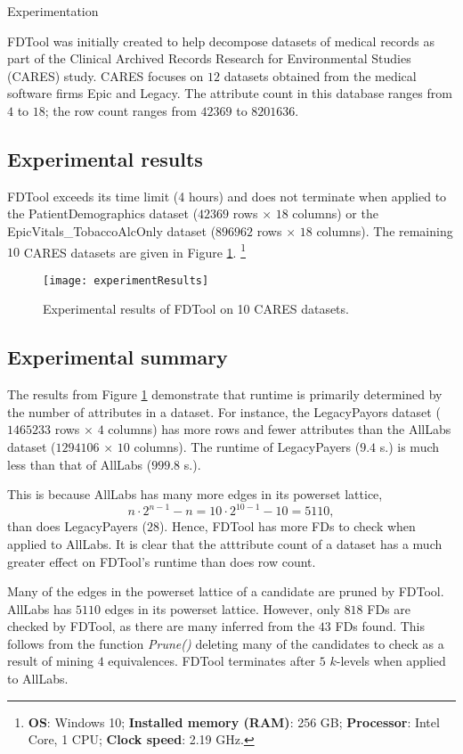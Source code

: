 \documentclass[6pt,twoside]{article}
\theoremstyle{plain}
\theoremstyle{definition}
\begin{document}
\begin{section}{Experimentation}

FDTool was initially created to help decompose datasets of medical records as part of the Clinical Archived Records Research for Environmental Studies (CARES) study. CARES focuses on $12$ datasets obtained from the medical software firms Epic and Legacy. The attribute count in this database ranges from $4$ to $18$; the row count ranges from $42369$ to $8201636$.

\subsection[Experimental results]{Experimental results}

FDTool exceeds its time limit (4 hours) and does not terminate when applied to the PatientDemographics dataset ($42369$ rows $\times$ $18$ columns) or the EpicVitals\_TobaccoAlcOnly dataset ($896962$ rows $\times$ $18$ columns). The remaining $10$ CARES datasets are given in Figure \ref{fig:CARES}. \footnote{\textbf{OS}: Windows 10; \textbf{Installed memory (RAM)}: 256 GB; \textbf{Processor}: Intel Core, 1 CPU; \textbf{Clock speed}: 2.19 GHz.} 

\begin{figure}[h]
	\centering
	\texttt{[image: experimentResults]}
	\textbf{\label{Fig. 2}}
	\caption{Experimental results of FDTool on 10 CARES datasets.}
	\label{fig:CARES}
\end{figure}

\subsection[Experimental summary]{Experimental summary}

The results from Figure \ref{fig:CARES} demonstrate that runtime is primarily determined by the number of attributes in a  dataset. For instance, the LegacyPayors dataset ($1465233$ rows $\times$ $4$ columns) has more rows and fewer attributes than the AllLabs dataset ($1294106$ $\times$ $10$ columns). The runtime of LegacyPayers ($9.4$ s.) is much less than that of AllLabs ($999.8$ s.).

This is because AllLabs has many more edges in its powerset lattice, 
$$
n \cdot 2^{n-1}-n= 10 \cdot 2^{10-1} - 10 = 5110,
$$
than does LegacyPayers ($28$). Hence, FDTool has more FDs to check when applied to AllLabs. It is clear that the atttribute count of a dataset has a much greater effect on FDTool's runtime than does row count.

Many of the edges in the powerset lattice of a candidate are pruned by FDTool. AllLabs has $5110$ edges in its powerset lattice. However, only $818$ FDs are checked by FDTool, as there are many inferred from the $43$ FDs found. This follows from the function \textit{Prune()} deleting many of the candidates to check as a result of mining $4$ equivalences. FDTool terminates after $5$ $k$-levels when applied to AllLabs.

\end{section}
\end{document}
